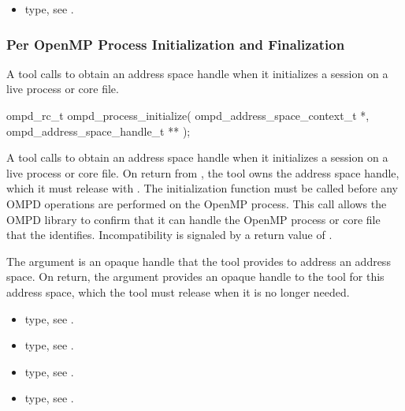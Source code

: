 \crossreferences
\begin{itemize}
\item {} type, see .
\end{itemize}



\subsubsection{Per OpenMP Process Initialization and Finalization}



\label{subsubsubsec:ompd_process_initialize}
\summary
A tool calls  to obtain an address space 
handle when it initializes a session on a live process or core file.

\format
\begin{cspecific}
\begin{ompSyntax}
ompd_rc_t ompd_process_initialize(
  ompd_address_space_context_t *,
  ompd_address_space_handle_t **
);
\end{ompSyntax}
\end{cspecific}

\descr
A tool calls  to obtain an address space 
handle when it initializes a session on a live process or core file.
On return from , the tool owns the address
space handle, which it must release with .
The initialization function must be called before any OMPD operations
are performed on the OpenMP process. This call allows the OMPD library 
to confirm that it can handle the OpenMP process or core file that the 
 identifies. Incompatibility is signaled by a 
return value of . 

\argdesc
The  argument is an opaque handle that the tool provides to 
address an address space. On return, the  argument provides 
an opaque handle to the tool for this address space, which the tool must
release when it is no longer needed.

\crossreferences
\begin{itemize}
\item {} type, 
see .

\item {} type, 
see .

\item {} type, see .

\item {} type, 
see .
\end{itemize}



